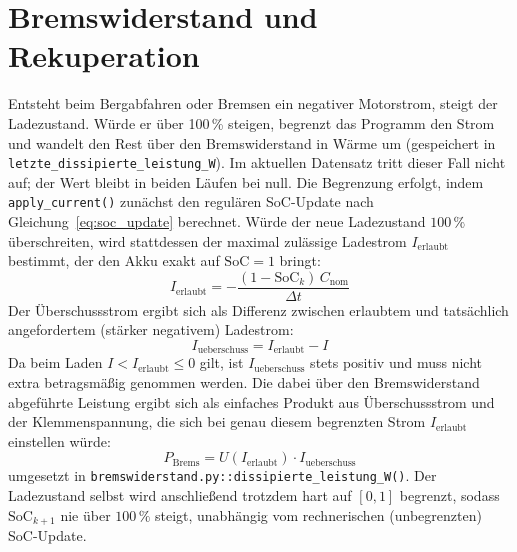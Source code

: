 \section{Bremswiderstand und Rekuperation}

Entsteht beim Bergabfahren oder Bremsen ein negativer Motorstrom, steigt der Ladezustand. Würde er über 100\,\% steigen, begrenzt das Programm den Strom und wandelt den Rest über den Bremswiderstand in Wärme um (gespeichert in \texttt{letzte\_dissipierte\_leistung\_W}). Im aktuellen Datensatz tritt dieser Fall nicht auf; der Wert bleibt in beiden Läufen bei null.
Die Begrenzung erfolgt, indem \texttt{apply\_current()} zunächst den regulären
SoC-Update nach Gleichung~\eqref{eq:soc_update} berechnet. Würde der neue Ladezustand
$100\,\%$ überschreiten, wird stattdessen der maximal zulässige Ladestrom
$I_{\mathrm{erlaubt}}$ bestimmt, der den Akku exakt auf $\mathrm{SoC} = 1$ bringt:
\begin{equation}
    I_{\mathrm{erlaubt}} = -\frac{(1 - \mathrm{SoC}_k)\,C_{\mathrm{nom}}}{\Delta t}
    \label{eq:istrom_erlaubt}
\end{equation}
Der Überschussstrom ergibt sich als Differenz zwischen erlaubtem und
tatsächlich angefordertem (stärker negativem) Ladestrom:
\begin{equation}
    I_{\mathrm{ueberschuss}} = I_{\mathrm{erlaubt}} - I
    \label{eq:iueberschuss}
\end{equation}
Da beim Laden $I < I_{\mathrm{erlaubt}} \le 0$ gilt, ist $I_{\mathrm{ueberschuss}}$
stets positiv und muss nicht extra betragsmäßig genommen werden. Die dabei
über den Bremswiderstand abgeführte Leistung ergibt sich als einfaches Produkt
aus Überschussstrom und der Klemmenspannung, die sich bei genau diesem
begrenzten Strom $I_{\mathrm{erlaubt}}$ einstellen würde:
\begin{equation}
    P_{\mathrm{Brems}} = U(I_{\mathrm{erlaubt}}) \cdot I_{\mathrm{ueberschuss}}
    \label{eq:pbrems}
\end{equation}
umgesetzt in \texttt{bremswiderstand.py::dissipierte\_leistung\_W()}. Der Ladezustand
selbst wird anschlie{\ss}end trotzdem hart auf $[0, 1]$ begrenzt, sodass $\mathrm{SoC}_{k+1}$
nie über $100\,\%$ steigt, unabhängig vom rechnerischen (unbegrenzten) SoC-Update.
